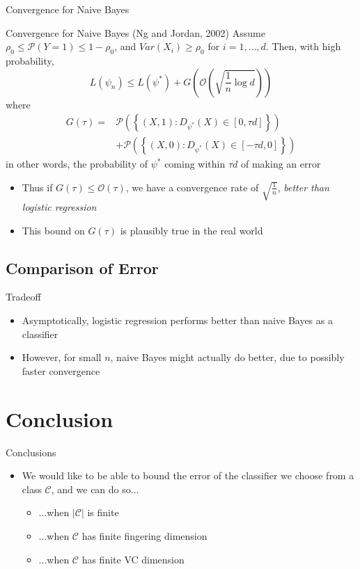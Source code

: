 \documentclass{beamer}
\renewcommand{\Pr}[1]{\mathcal{P} \left( #1 \right)}
\newcommand{\cls}{\mathcal{C}}
\newcommand{\pa}[1]{\left( #1 \right)}
\newcommand{\abs}[1]{\left| #1 \right|}
\newcommand{\br}[1]{\left\{ #1 \right\} }
\begin{document}
\begin{frame}{Convergence for Naive Bayes}
\begin{block}{Convergence for Naive Bayes (Ng and Jordan, 2002)}
Assume  $\rho_0 \leq \Pr{Y=1} \leq 1 - \rho_0$, and $Var(X_i) \geq \rho_0$ for $i=1,\ldots,d$. Then, with high probability,
\[ L(\psi_n) \leq L(\psi^*) + G\pa{\mathcal O\pa{\sqrt{\frac1n \log d}}} \]
where
\begin{align*}
 G(\tau)   = &  \Pr{\br{(X,1) : D_{\psi^*}(X) \in [0,\tau d]}} \\
 	&   + \Pr{ \br{(X,0) : D_{\psi^*}(X) \in [-\tau d,0]}} \end{align*}
in other words, the probability of $\psi^*$ coming within $\tau d$ of making an error
\end{block}
\begin{itemize}
\item Thus if $G(\tau) \leq \mathcal{O}(\tau)$, we have a convergence rate of $\sqrt{\frac1n}$, \emph{better than logistic regression}
\item This bound on $G(\tau)$ is plausibly true in the real world
\end{itemize}
\end{frame}

\subsection{Comparison of Error}
\begin{frame}{Tradeoff}
\begin{itemize}
\item Asymptotically, logistic regression performs better than naive Bayes as a classifier
\item However, for small $n$, naive Bayes might actually do better, due to possibly faster convergence
\end{itemize}
\end{frame}

\section{Conclusion}
\begin{frame}{Conclusions}
\begin{itemize}
\item We would like to be able to bound the error of the classifier we choose from a class $\cls$, and we can do so...
\begin{itemize}
\item ...when $\abs{\cls}$ is finite
\item ...when $\cls$ has finite fingering dimension
\item ...when $\cls$ has finite VC dimension
\end{itemize}
\end{itemize}
\end{frame}
\end{document}
